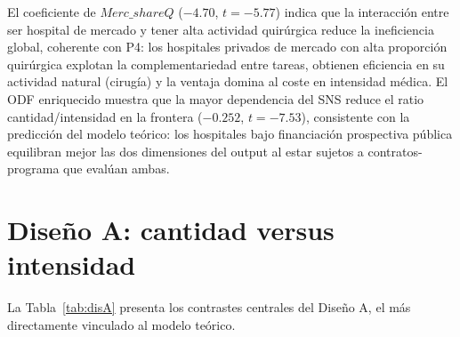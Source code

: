 El coeficiente de $Merc\_shareQ$ ($-4.70$, $t=-5.77$) indica que la interacción entre ser hospital de mercado y tener alta actividad quirúrgica reduce la ineficiencia global, coherente con P4: los hospitales privados de mercado con alta proporción quirúrgica explotan la complementariedad entre tareas, obtienen eficiencia en su actividad natural (cirugía) y la ventaja domina al coste en intensidad médica. El ODF enriquecido muestra que la mayor dependencia del SNS reduce el ratio cantidad/intensidad en la frontera ($-0.252$, $t=-7.53$), consistente con la predicción del modelo teórico: los hospitales bajo financiación prospectiva pública equilibran mejor las dos dimensiones del output al estar sujetos a contratos-programa que evalúan ambas.


\section{Diseño A: cantidad versus intensidad}
\label{sec:res_A}

La Tabla~\ref{tab:disA} presenta los contrastes centrales del Diseño A, el más directamente vinculado al modelo teórico.

